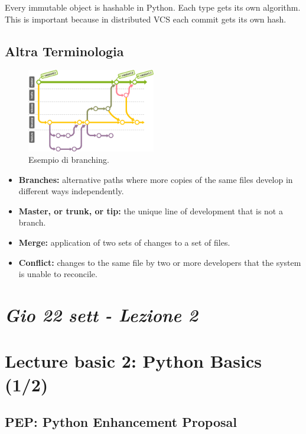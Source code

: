 Every immutable object is hashable in Python. Each type gets its own algorithm.
This is important because in distributed VCS each commit gets its own hash.




\subsection{Altra Terminologia}

\begin{figure}[ht]
    \centering
    \includegraphics[width=0.5\textwidth]{lez1/branching.png}
    \caption{Esempio di branching.}
    \label{branching}
\end{figure}
\FloatBarrier


\begin{itemize}
  \renewcommand\labelitemi{--}
  \setlength\itemsep{0.1em}
  \item \textbf{Branches:} alternative paths where more copies of the same files develop in different ways independently.
  
  \item \textbf{Master, or trunk, or tip:} the unique line of development that is not a branch.
  
  \item \textbf{Merge:} application of two sets of changes to a set of files.
  \item \textbf{Conflict:} changes to the same file by two or more developers that
the system is unable to reconcile.
  \end{itemize}

\newpage
\section{\textit{Gio 22 sett - Lezione 2}}
\section{Lecture basic 2: Python Basics (1/2)}

\subsection{PEP: Python Enhancement Proposal}

